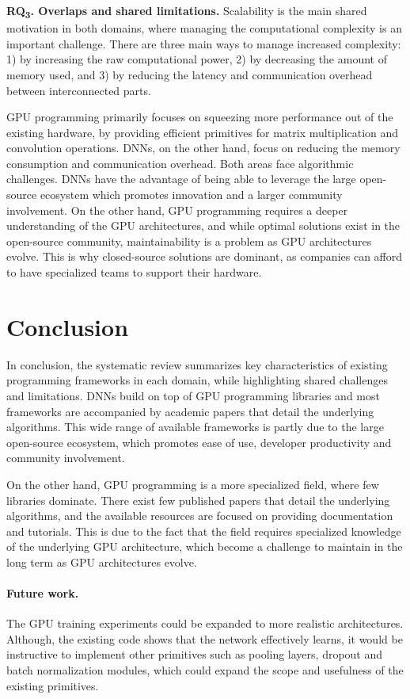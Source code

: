 \textbf{RQ\textsubscript{3}. Overlaps and shared limitations.}
Scalability is the main shared motivation in both domains, where managing the computational
complexity is an important challenge. There are three main ways to manage increased complexity: 1)
by increasing the raw computational power, 2) by decreasing the amount of memory used, and 3) by
reducing the latency and communication overhead between interconnected parts.

GPU programming primarily focuses on squeezing more performance out of the existing hardware, by
providing efficient primitives for matrix multiplication and convolution operations. DNNs, on the
other hand, focus on reducing the memory consumption and communication overhead. Both areas face
algorithmic challenges. DNNs have the advantage of being able to leverage the large open-source
ecosystem which promotes innovation and a larger community involvement. On the other hand, GPU
programming requires a deeper understanding of the GPU architectures, and while optimal solutions
exist in the open-source community, maintainability is a problem as GPU architectures evolve. This
is why closed-source solutions are dominant, as companies can afford to have specialized teams to
support their hardware.

\section{Conclusion}
\label{sec:conclusion}
In conclusion, the systematic review summarizes key characteristics of existing programming frameworks
in each domain, while highlighting shared challenges and limitations. DNNs build on top of GPU programming
libraries and most frameworks are accompanied by academic papers that detail the underlying algorithms.
This wide range of available frameworks is partly due to the large open-source ecosystem, which promotes
ease of use, developer productivity and community involvement.

On the other hand, GPU programming is a more specialized field, where few libraries dominate. There
exist few published papers that detail the underlying algorithms, and the available resources are
focused on providing documentation and tutorials. This is due to the fact that the field requires
specialized knowledge of the underlying GPU architecture, which become a challenge to maintain in
the long term as GPU architectures evolve.

\paragraph{Future work.}
The GPU training experiments could be expanded to more realistic architectures. Although, the
existing code shows that the network effectively learns, it would be instructive to implement other
primitives such as pooling layers, dropout and batch normalization modules, which could expand the
scope and usefulness of the existing primitives.

